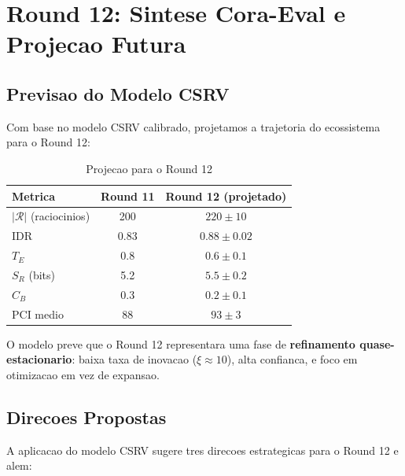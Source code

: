 \documentclass[5p]{elsarticle}
\begin{document}
\section{Round 12: Sintese Cora-Eval e Projecao Futura}

\subsection{Previsao do Modelo CSRV}

Com base no modelo CSRV calibrado, projetamos a trajetoria do ecossistema
para o Round 12:

\begin{table}[H]
  \centering
  \caption{Projecao para o Round 12}
  \label{tab:round12}
  \begin{tabular}{lcc}
    \toprule
    \textbf{Metrica} & \textbf{Round 11} & \textbf{Round 12 (projetado)} \\
    \midrule
    $|\mathcal{R}|$ (raciocinios) & 200 & $220 \pm 10$ \\
    IDR & 0.83 & $0.88 \pm 0.02$ \\
    $T_E$ & 0.8 & $0.6 \pm 0.1$ \\
    $S_R$ (bits) & 5.2 & $5.5 \pm 0.2$ \\
    $C_B$ & 0.3 & $0.2 \pm 0.1$ \\
    PCI medio & 88 & $93 \pm 3$ \\
    \bottomrule
  \end{tabular}
\end{table}

O modelo preve que o Round 12 representara uma fase de \textbf{refinamento
quase-estacionario}: baixa taxa de inovacao ($\xi \approx 10$), alta confianca,
e foco em otimizacao em vez de expansao.

\subsection{Direcoes Propostas}

A aplicacao do modelo CSRV sugere tres direcoes estrategicas para o
Round 12 e alem:
\end{document}
